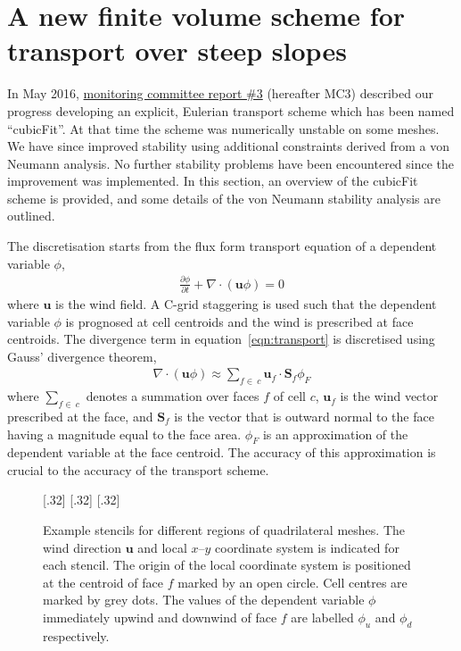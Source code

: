\documentclass[a4paper,11pt]{article}
\begin{document}
\section{A new finite volume scheme for transport over steep slopes}
In May 2016, \href{http://www.datumedge.co.uk/publications/mc-report-2016-05.pdf}{monitoring committee report \#3} (hereafter MC3) described our progress developing an explicit, Eulerian transport scheme which has been named ``cubicFit''.  At that time the scheme was numerically unstable on some meshes.  We have since improved stability using additional constraints derived from a von Neumann analysis.  No further stability problems have been encountered since the improvement was implemented.  In this section, an overview of the cubicFit scheme is provided, and some details of the von Neumann stability analysis are outlined.

The discretisation starts from the flux form transport equation of a dependent variable $\phi$,
\begin{align}
	\frac{\partial \phi}{\partial t} + \nabla \cdot \left( \mathbf{u} \phi \right) = 0 \label{eqn:transport}
\end{align}
where $\mathbf{u}$ is the wind field.  A C-grid staggering is used such that the dependent variable $\phi$ is prognosed at cell centroids and the wind is prescribed at face centroids.  The divergence term in equation~\eqref{eqn:transport} is discretised using Gauss' divergence theorem,
\begin{align}
	\nabla \cdot \left( \mathbf{u} \phi \right) \approx \sum_{f \in\:c} \mathbf{u}_f \cdot \mathbf{S}_f \phi_F
\end{align}
where $\sum_{f \in\:c}$ denotes a summation over faces $f$ of cell $c$, $\mathbf{u}_f$ is the wind vector prescribed at the face, and $\mathbf{S}_f$ is the vector that is outward normal to the face having a magnitude equal to the face area.  $\phi_F$ is an approximation of the dependent variable at the face centroid.  The accuracy of this approximation is crucial to the accuracy of the transport scheme.

\begin{figure}
	\centering
	[.32\linewidth]{}
	[.32\linewidth]{}
	[.32\linewidth]{}
	\caption{Example stencils for different regions of quadrilateral meshes.  The wind direction $\mathbf{u}$ and local $x$--$y$ coordinate system is indicated for each stencil.  The origin of the local coordinate system is positioned at the centroid of face $f$ marked by an open circle.  Cell centres are marked by grey dots.  The values of the dependent variable $\phi$ immediately upwind and downwind of face $f$ are labelled $\phi_u$ and $\phi_d$ respectively.}
	\label{fig:stencils}
\end{figure}
\end{document}
